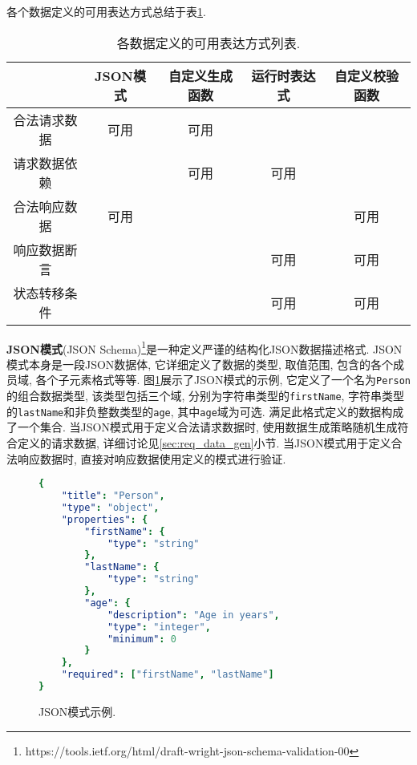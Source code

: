         各个数据定义的可用表达方式总结于表\ref{tab:data_def_format}.
        
        \begin{table}[!htb]
            \centering
            \begin{tabular}{c||c|c|c|c}
                \toprule
                 & JSON模式 & 自定义生成函数 & 运行时表达式 & 自定义校验函数 \\
                \hline
                合法请求数据 & 可用 & 可用 & & \\
                \hline
                请求数据依赖 & & 可用 & 可用 & \\ 
                \hline
                合法响应数据 & 可用 & & & 可用 \\
                \hline
                响应数据断言 & & & 可用 & 可用 \\
                \hline
                状态转移条件 & & & 可用 & 可用 \\
                \bottomrule
            \end{tabular}
            \caption[各数据定义的可用表达方式表]{各数据定义的可用表达方式列表.}
            \label{tab:data_def_format}
        \end{table}
        
        \label{sec:set_define}
        
        \textbf{JSON模式}(JSON Schema)\footnote{https://tools.ietf.org/html/draft-wright-json-schema-validation-00}是一种定义严谨的结构化JSON数据描述格式. JSON模式本身是一段JSON数据体, 它详细定义了数据的类型, 取值范围, 包含的各个成员域, 各个子元素格式等等. 图\ref{fig:json_schema_example}展示了JSON模式的示例, 它定义了一个名为\texttt{Person}的组合数据类型, 该类型包括三个域, 分别为字符串类型的\texttt{firstName}, 字符串类型的\texttt{lastName}和非负整数类型的\texttt{age}, 其中\texttt{age}域为可选. 满足此格式定义的数据构成了一个集合. 当JSON模式用于定义合法请求数据时, 使用数据生成策略随机生成符合定义的请求数据, 详细讨论见\ref{sec:req_data_gen}小节. 当JSON模式用于定义合法响应数据时, 直接对响应数据使用定义的模式进行验证.
        \begin{figure}[!htb]
            \centering
            \scriptsize
            \tt
            
            \begin{lstlisting}[language=YAML]
{
    "title": "Person",
    "type": "object",
    "properties": {
        "firstName": {
            "type": "string"
        },
        "lastName": {
            "type": "string"
        },
        "age": {
            "description": "Age in years",
            "type": "integer",
            "minimum": 0
        }
    },
    "required": ["firstName", "lastName"]
}
            \end{lstlisting}
            
            \caption[JSON模式示例]{JSON模式示例.}
            \label{fig:json_schema_example}
        \end{figure}
        
